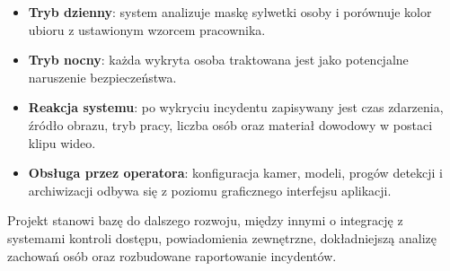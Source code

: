 \begin{itemize}
\item \textbf{Tryb dzienny}: system analizuje maskę sylwetki osoby i porównuje kolor ubioru z ustawionym wzorcem pracownika.
\item \textbf{Tryb nocny}: każda wykryta osoba traktowana jest jako potencjalne naruszenie bezpieczeństwa.
\item \textbf{Reakcja systemu}: po wykryciu incydentu zapisywany jest czas zdarzenia, źródło obrazu, tryb pracy, liczba osób oraz materiał dowodowy w postaci klipu wideo.
\item \textbf{Obsługa przez operatora}: konfiguracja kamer, modeli, progów detekcji i archiwizacji odbywa się z poziomu graficznego interfejsu aplikacji.
\end{itemize}

Projekt stanowi bazę do dalszego rozwoju, między innymi o integrację z systemami kontroli dostępu, powiadomienia zewnętrzne, dokładniejszą analizę zachowań osób oraz rozbudowane raportowanie incydentów.
